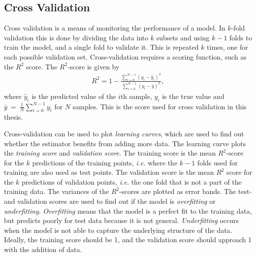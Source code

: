 \documentclass[twoside,english]{uiofysmaster}
\begin{document}
{{\subsection{Cross Validation}\label{Sec:: gaussian process : Cross Validation}


Cross validation is a means of monitoring the performance of a model. In $k$-fold validation this is done by dividing the data into $k$ subsets and using $k-1$ folds to train the model, and a single fold to validate it. This is repeated $k$ times, one for each possible validation set. Cross-validation requires a scoring function, such as the $R^2$ score. The $R^2$-score is given by 
\begin{align}
R^2 = 1 - \frac{\sum_{i=0}^{N-1} (y_i - \hat{y}_i)^2}{\sum_{i=0}^{N-1} (y_i - \bar{y})^2},
\end{align}
where $\hat{y}_i$ is the predicted value of the $i$th sample, $y_i$ is the true value and $\bar{y}~=~\frac{1}{N} \sum_{i = 0}^{N-1} y_i$ for $N$ samples. This is the score used for cross validation in this thesis.

Cross-validation can be used to plot \textit{learning curves}, which are used to find out whether the estimator benefits from adding more data. The learning curve plots the \textit{training score} and \textit{validation score}. The training score is the mean $R^2$-score for the $k$ predictions of the training points, \textit{i.e.} where the $k-1$ folds used for training are also used as test points. The validation score is the mean $R^2$ score for the $k$ predictions of validation points, \textit{i.e.} the one fold that is not a part of the training data. The variances of the $R^2$-scores are plotted as error bands. The test- and validation scores are used to find out if the model is \textit{overfitting} or \textit{underfitting}. \textit{Overfitting} means that the model is a perfect fit to the training data, but predicts poorly for test data because it is not general. \textit{Underfitting} occurs when the model is not able to capture the underlying structure of the data. Ideally, the training score should be 1, and the validation score should approach 1 with the addition of data.

}}
\end{document}
